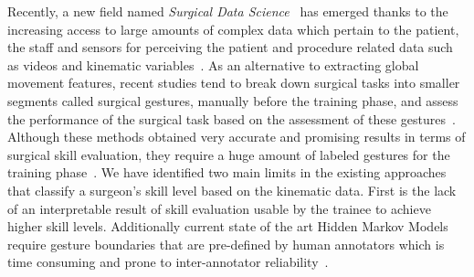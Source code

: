 \documentclass{llncs}
\begin{document}
Recently, a new field named \emph{Surgical Data Science}~\cite{maier-hein2017surgical} has emerged thanks to the increasing access to large amounts of complex data which pertain to the patient, the staff and sensors for perceiving the patient and procedure related data such as videos and kinematic variables~\cite{gao2014jhu}.
As an alternative to extracting global movement features, recent studies tend to break down surgical tasks into smaller segments called surgical gestures, manually before the training phase, and assess the performance of the surgical task based on the assessment of these gestures~\cite{lingling2012sparse}. 
Although these methods obtained very accurate and promising results in terms of surgical skill evaluation, they require a huge amount of labeled gestures for the training phase~\cite{lingling2012sparse}.
We have identified two main limits in the existing approaches that classify a surgeon's skill level based on the kinematic data.
First is the lack of an interpretable result of skill evaluation usable by the trainee to achieve higher skill levels.
Additionally current state of the art Hidden Markov Models require gesture boundaries that are pre-defined by human annotators which is time consuming and prone to inter-annotator reliability~\cite{vedula2016analysis}. 

\usetikzlibrary{quotes,arrows.meta,positioning,decorations.pathreplacing,calc,3d,arrows}
\newcommand\XS{0.4}
\newcommand\YS{0.5}
\newcommand\ZS{0.5}
\newcommand\layeroneonecoord{1.5,0,0*\ZS}
\newcommand\layeronetwocoord{1.5,0,-\ZS*10.0}
\newcommand\layeronethreecoord{1.5,0,-\ZS*12.0}
\newcommand\layeronefourcoord{1.5,0,-\ZS*14.0}

\newcommand\layertwoonecoord{3.35,0,-3}

\newcommand\layerthreeonecoord{5.2,0,-2}

\newcommand\layerfouronecoord{6.9,0,-1}

\newcommand\inputeightcoord{-0.1,0,-9.2}\newcommand\inputsevencoord{-0.1,0,-8.2}\newcommand\inputsixcoord{-0.1,0,-7.2}\newcommand\inputfivecoord{-0.1,0,-4.9}\newcommand\inputfourcoord{-0.1,0,-4}\newcommand\inputthreecoord{-0.1,0,-2.6}\newcommand\inputtwocoord{-0.1,0,-0.7}\newcommand\inputonecoord{0.15,0,+2.05}

\newcommand\novicecoord{8.0,0,2}
\newcommand\intermediatecoord{8.0,0,0}
\newcommand\expertcoord{8.0,0,-2}
\end{document}
